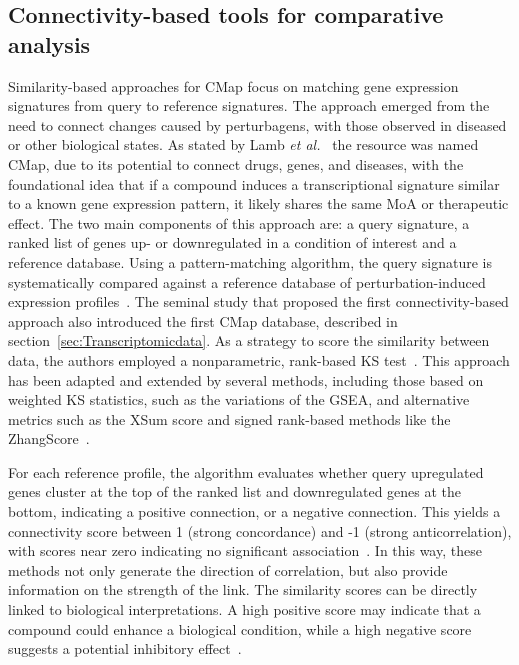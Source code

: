 \subsection{Connectivity-based tools for comparative analysis} %
\label{sub:connectivity-basedmethods}

Similarity-based approaches for \gls{CMap} focus on matching gene expression signatures from query to reference signatures. 
The approach emerged from the need to connect changes caused by perturbagens, with those observed in diseased or other biological states.
As stated by Lamb \textit{et al.}~\cite{RN34} the resource was named \gls{CMap}, due to its potential to connect drugs, genes, and diseases, with the foundational idea that if a compound induces a transcriptional signature similar to a known gene expression pattern, it likely shares the same \gls{MoA} or therapeutic effect. 
The two main components of this approach are: a query signature, a ranked list of genes up- or downregulated in a condition of interest and a reference database.  
Using a pattern-matching algorithm, the query signature is systematically compared against a reference database of perturbation-induced expression profiles~\cite{RN155}. 
The seminal study that proposed the first connectivity-based approach also introduced the first \gls{CMap} database, described in section~\ref{sec:Transcriptomicdata}. 
As a strategy to score the similarity between data, the authors employed a nonparametric, rank-based \gls{KS} test~\cite{RN34, RN79}. 
This approach has been adapted and extended by several methods, including those based on weighted \gls{KS} statistics, such as the variations of the \gls{GSEA}, and alternative metrics such as the \gls{XSum} score and signed rank-based methods like the ZhangScore~\cite{RN79}. 

For each reference profile, the algorithm evaluates whether query upregulated genes cluster at the top of the ranked list and downregulated genes at the bottom, indicating a positive connection, or a negative connection. 
This yields a connectivity score between 1 (strong concordance) and -1 (strong anticorrelation), with scores near zero indicating no significant association~\cite{RN34}. 
In this way, these methods not only generate the direction of correlation, but also provide information on the strength of the link. 
The similarity scores can be directly linked to biological interpretations. 
A high positive score may indicate that a compound could enhance a biological condition, while a high negative score suggests a potential inhibitory effect~\cite{RN102}. 

